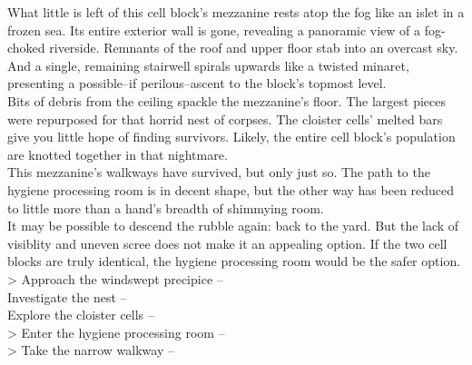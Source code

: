 What little is left of this cell block’s mezzanine rests atop the fog like an islet in a frozen sea. Its entire exterior wall is gone, revealing a panoramic view of a fog-choked riverside. Remnants of the roof and upper floor stab into an overcast sky. And a single, remaining stairwell spirals upwards like a twisted minaret, presenting a possible--if perilous--ascent to the block’s topmost level.\\

Bits of debris from the ceiling spackle the mezzanine's floor. The largest pieces were repurposed for that horrid nest of corpses. The cloister cells’ melted bars give you little hope of finding survivors. Likely, the entire cell block's population are knotted together in that nightmare.\\

This mezzanine's walkways have survived, but only just so. The path to the hygiene processing room is in decent shape, but the other way has been reduced to little more than a hand's breadth of shimmying room.\\

It may be possible to descend the rubble again: back to the yard. But the lack of visiblity and uneven scree does not make it an appealing option. If the two cell blocks are truly identical, the hygiene processing room would be the safer option.\\

> Approach the windswept precipice -- \\
 Investigate the nest -- \\
 Explore the cloister cells -- \\
> Enter the hygiene processing room -- \\
> Take the narrow walkway -- 